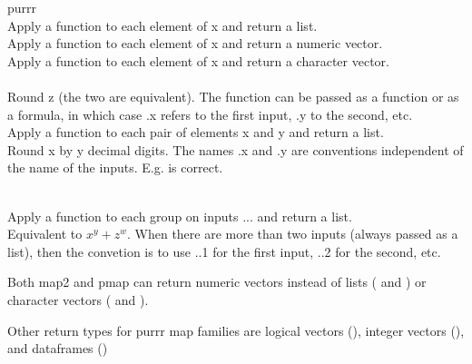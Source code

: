 
\vspace{2ex}

\begin{block}{purrr}
  \\Apply a function to each element of x and return a list.\br
  \\Apply a function to each element of x and return a numeric vector.\br
  \\Apply a function to each element of x and return a character vector.\br
  \\
  \\ Round z (the two are equivalent).\br
  The function can be passed as a function or as a formula, in which case .x refers to the first input, .y to the second, etc.
  \\Apply a function to each pair of elements x and y and return a list.\br
  \\
  Round x by y decimal digits.\br
  The names .x and .y are conventions independent of the name of the inputs. E.g.  is correct.
  
  \\Apply a function to each group on inputs ... and return a list.\br
  \\
  Equivalent to $x ^ y + z ^ w$.\br
  When there are more than two inputs (always passed as a list), then the convetion is to use ..1 for the first input, ..2 for the second, etc.\br

  Both map2 and pmap can return numeric vectors instead of lists ( and ) or character vectors ( and ).\br

  Other return types for purrr map families are logical vectors (), integer vectors (), and dataframes ()


\end{block}
